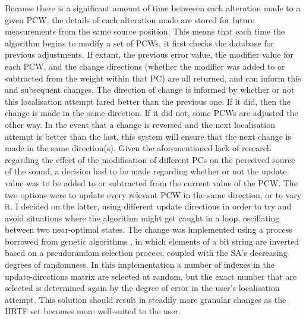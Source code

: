 Because there is a significant amount of time betweeen each alteration made to a given PCW, the details of each alteration made are stored for future measurements from the same source position. This means that each time the algorithm begins to modify a set of PCWs, it first checks the database for previous adjustments. If extant, the previous error value, the modifier value for each PCW, and the change directions (whether the modifier was added to or subtracted from the weight within that PC) are all returned, and can inform this and subsequent changes. The direction of change is informed by whether or not this localisation attempt fared better than the previous one. If it did, then the change is made in the same direction. If it did not, some PCWs are adjusted the other way. In the event that a change is reversed and the next localisation attempt is better than the last, this system will ensure that the next change is made in the same direction(s). Given the aforementioned lack of research regarding the effect of the modification of different PCs on the perceived source of the sound, a decision had to be made regarding whether or not the update value was to be added to or subtracted from the current value of the PCW. The two options were to update every relevant PCW in the same direction, or to vary it. I decided on the latter, using different update directions in order to try and avoid situations where the algorithm might get caught in a loop, oscillating between two near-optimal states. The change was implemented using a process borrowed from genetic algorithms \citep{Whitley1994}, in which elements of a bit string are inverted based on a pseudorandom selection  process, coupled with the SA's decreasing degrees of randomness. In this implementation a number of indexes in the update-directions matrix are selected at random, but the exact number that are selected is determined again by the degree of error in the user's localisation attempt. This solution should result in steadily more granular changes as the HRTF set becomes more well-suited to the user. 

